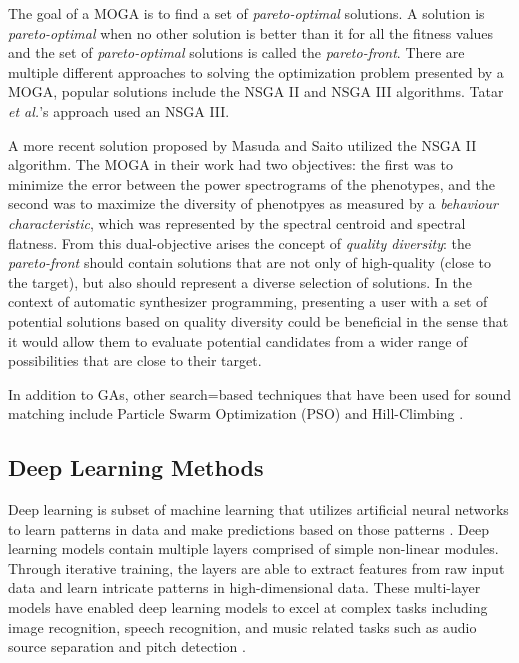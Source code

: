 The goal of a MOGA is to find a set of \textit{pareto-optimal} solutions. A solution is \textit{pareto-optimal} when no other solution is better than it for all the fitness values and the set of \textit{pareto-optimal} solutions is called the \textit{pareto-front}. There are multiple different approaches to solving the optimization problem presented by a MOGA, popular solutions include the NSGA II \cite{deb2002fast} and NSGA III \cite{deb2013evolutionary} algorithms. Tatar \textit{et al.}'s approach used an NSGA III. 

A more recent solution proposed by Masuda and Saito \cite{masudo2021quality} utilized the NSGA II algorithm. The MOGA in their work had two objectives: the first was to minimize the error between the power spectrograms of the phenotypes, and the second was to maximize the diversity of phenotpyes as measured by a \textit{behaviour characteristic}, which was represented by the spectral centroid and spectral flatness. From this dual-objective arises the concept of \textit{quality diversity}: the \textit{pareto-front} should contain solutions that are not only of high-quality (close to the target), but also should represent a diverse selection of solutions. In the context of automatic synthesizer programming, presenting a user with a set of potential solutions based on quality diversity could be beneficial in the sense that it would allow them to evaluate potential candidates from a wider range of possibilities that are close to their target.


In addition to GAs, other search=based techniques that have been used for sound matching include Particle Swarm Optimization (PSO) \cite{heise2009automatic} and Hill-Climbing \cite{roth2011comparison, luke2019stochastic}.

\subsection{Deep Learning Methods}
Deep learning is subset of machine learning that utilizes artificial neural networks to learn patterns in data and make predictions based on those patterns \cite{lecun2015deep}. Deep learning models contain multiple layers comprised of simple non-linear modules. Through iterative training, the layers are able to extract features from raw input data and learn intricate patterns in high-dimensional data. These multi-layer models have enabled deep learning models to excel at complex tasks including image recognition, speech recognition, and music related tasks such as audio source separation \cite{spleeter2019} and pitch detection \cite{kim2018crepe}.

